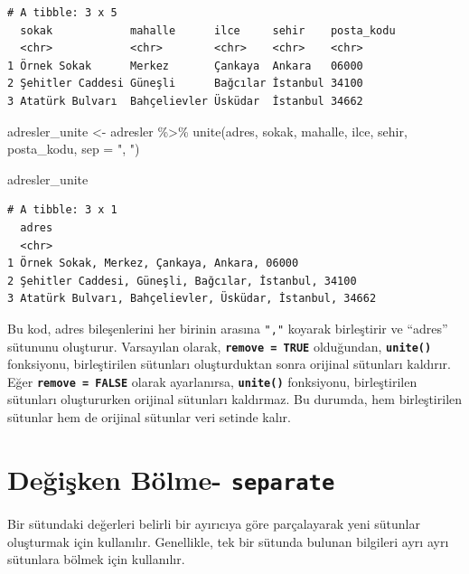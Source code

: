 \documentclass[
  letterpaper,
  DIV=11,
  numbers=noendperiod]{scrreprt}
\newenvironment{Shaded}{\begin{snugshade}}{\end{snugshade}}
\newcommand{\AttributeTok}[1]{\textcolor[rgb]{0.40,0.45,0.13}{#1}}
\newcommand{\FunctionTok}[1]{\textcolor[rgb]{0.28,0.35,0.67}{#1}}
\newcommand{\NormalTok}[1]{\textcolor[rgb]{0.00,0.23,0.31}{#1}}
\newcommand{\OtherTok}[1]{\textcolor[rgb]{0.00,0.23,0.31}{#1}}
\newcommand{\SpecialCharTok}[1]{\textcolor[rgb]{0.37,0.37,0.37}{#1}}
\newcommand{\StringTok}[1]{\textcolor[rgb]{0.13,0.47,0.30}{#1}}
\begin{document}
\begin{verbatim}
# A tibble: 3 x 5
  sokak            mahalle      ilce     sehir    posta_kodu
  <chr>            <chr>        <chr>    <chr>    <chr>     
1 Örnek Sokak      Merkez       Çankaya  Ankara   06000     
2 Şehitler Caddesi Güneşli      Bağcılar İstanbul 34100     
3 Atatürk Bulvarı  Bahçelievler Üsküdar  İstanbul 34662     
\end{verbatim}

\begin{Shaded}
\begin{Highlighting}[]
\NormalTok{adresler\_unite }\OtherTok{\textless{}{-}}\NormalTok{ adresler }\SpecialCharTok{\%\textgreater{}\%}
  \FunctionTok{unite}\NormalTok{(adres, sokak, mahalle, ilce, sehir, posta\_kodu, }\AttributeTok{sep =} \StringTok{", "}\NormalTok{)}

\NormalTok{adresler\_unite}
\end{Highlighting}
\end{Shaded}

\begin{verbatim}
# A tibble: 3 x 1
  adres                                                  
  <chr>                                                  
1 Örnek Sokak, Merkez, Çankaya, Ankara, 06000            
2 Şehitler Caddesi, Güneşli, Bağcılar, İstanbul, 34100   
3 Atatürk Bulvarı, Bahçelievler, Üsküdar, İstanbul, 34662
\end{verbatim}

Bu kod, adres bileşenlerini her birinin arasına \texttt{","} koyarak
birleştirir ve ``adres'' sütununu oluşturur. Varsayılan olarak,
\textbf{\texttt{remove\ =\ TRUE}} olduğundan, \textbf{\texttt{unite()}}
fonksiyonu, birleştirilen sütunları oluşturduktan sonra orijinal
sütunları kaldırır. Eğer \textbf{\texttt{remove\ =\ FALSE}} olarak
ayarlanırsa, \textbf{\texttt{unite()}} fonksiyonu, birleştirilen
sütunları oluştururken orijinal sütunları kaldırmaz. Bu durumda, hem
birleştirilen sütunlar hem de orijinal sütunlar veri setinde kalır.

\section*{\texorpdfstring{Değişken Bölme-
\texttt{separate}}{Değişken Bölme- separate}}\label{deux11fiux15fken-buxf6lme--separate}


Bir sütundaki değerleri belirli bir ayırıcıya göre parçalayarak yeni
sütunlar oluşturmak için kullanılır. Genellikle, tek bir sütunda bulunan
bilgileri ayrı ayrı sütunlara bölmek için kullanılır.
\end{document}
